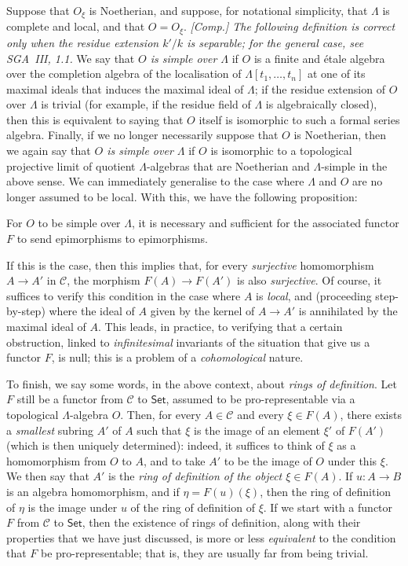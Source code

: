 \documentclass{article}
\theoremstyle{plain}
\newenvironment{proposition}[1]
  {\renewcommand\theinnercustomproposition{#1}\innercustomproposition}
  {\endinnercustomproposition}
\theoremstyle{definition}
\newcommand{\cat}[1]{{\mathcal{#1}}}
\newcommand{\Set}{\mathsf{Set}}
\newcommand{\oldpage}[1]{\marginpar{\footnotesize$\Big\vert$ \textit{p.~#1}}}
\begin{document}
Suppose that $O_\xi$ is Noetherian, and suppose, for notational simplicity, that $\Lambda$ is complete and local, and that $O=O_\xi$.
\emph{[Comp.] The following definition is correct only when the residue extension $k'/k$ is \emph{separable}; for the general case, see SGA~III, 1.1.}
We say that \emph{$O$ is simple over $\Lambda$} if $O$ is a finite and \'{e}tale algebra over the completion algebra of the localisation of $\Lambda[t_1,\ldots,t_n]$ at one of its maximal ideals that induces the maximal ideal of $\Lambda$;
if the residue extension of $O$ over $\Lambda$ is trivial (for example, if the residue field of $\Lambda$ is algebraically closed), then this is equivalent to saying that $O$ itself is isomorphic to such a formal series algebra.
Finally, if we no longer necessarily suppose that $O$ is Noetherian, then we again say that \emph{$O$ is simple over $\Lambda$} if $O$ is isomorphic to a topological projective limit of quotient $\Lambda$-algebras that are Noetherian and $\Lambda$-simple in the above sense.
We can immediately generalise to the case where $\Lambda$ and $O$ are no longer assumed to be local.
With this, we have the following proposition:

\begin{proposition}{5.2}
\label{A.5-proposition2}
  For $O$ to be simple over $\Lambda$, it is necessary and sufficient for the associated functor $F$ to send epimorphisms to epimorphisms.
\end{proposition}

If this is the case, then this implies that, for every \emph{surjective} homomorphism $A\to A'$ in $\cat{C}$, the morphism $F(A)\to F(A')$ is also \emph{surjective}.
Of course, it suffices to verify this condition in the case where $A$ is \emph{local}, and (proceeding step-by-step) where the ideal of $A$ given by the kernel of $A\to A'$ is annihilated by the maximal ideal of $A$.
This leads, in practice, to verifying that a certain obstruction, linked to \emph{infinitesimal} invariants
\oldpage{195-09}
of the situation that give us a functor $F$, is null;
this is a problem of a \emph{cohomological} nature.

To finish, we say some words, in the above context, about \emph{rings of definition}.
Let $F$ still be a functor from $\cat{C}$ to $\Set$, assumed to be pro-representable via a topological $\Lambda$-algebra $O$.
Then, for every $A\in\cat{C}$ and every $\xi\in F(A)$, there exists a \emph{smallest} subring $A'$ of $A$ such that $\xi$ is the image of an element $\xi'$ of $F(A')$ (which is then uniquely determined):
indeed, it suffices to think of $\xi$ as a homomorphism from $O$ to $A$, and to take $A'$ to be the image of $O$ under this $\xi$.
We then say that $A'$ is the \emph{ring of definition of the object $\xi\in F(A)$}.
If $u\colon A\to B$ is an algebra homomorphism, and if $\eta=F(u)(\xi)$, then the ring of definition of $\eta$ is the image under $u$ of the ring of definition of $\xi$.
If we start with a functor $F$ from $\cat{C}$ to $\Set$, then the existence of rings of definition, along with their properties that we have just discussed, is more or less \emph{equivalent} to the condition that $F$ be pro-representable;
that is, they are usually far from being trivial.
\end{document}
